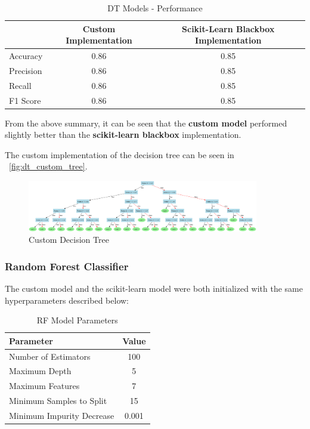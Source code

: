\begin{table}[h!]
  \centering
  \begin{tabular}{lcc}
    \toprule
              & \textbf{Custom Implementation} & \textbf{Scikit-Learn Blackbox Implementation} \\
    \midrule
    Accuracy  & 0.86                           & 0.85                                          \\
    Precision & 0.86                           & 0.85                                          \\
    Recall    & 0.86                           & 0.85                                          \\
    F1 Score  & 0.86                           & 0.85                                          \\
    \bottomrule
  \end{tabular}
  \caption{DT Models - Performance}
  \label{tab:dt_model_performance}
\end{table}

From the above summary, it can be seen that the \textbf{custom model} performed slightly better than the \textbf{scikit-learn blackbox} implementation.

The custom implementation of the decision tree can be seen in ~\autoref{fig:dt_custom_tree}.

\begin{figure}[H]
  \centering
  \includegraphics[width=0.9\textwidth]{tree_visualization.png}
  \caption{Custom Decision Tree}
  \label{fig:dt_custom_tree}
\end{figure}
\FloatBarrier

\subsubsection{Random Forest Classifier}

The custom model and the scikit-learn model were both initialized with the same hyperparameters described below:

\begin{table}[H]
  \centering
  \begin{tabular}{lc}
    \toprule
    \textbf{Parameter}        & \textbf{Value} \\
    \midrule
    Number of Estimators      & 100            \\
    Maximum Depth             & 5              \\
    Maximum Features          & 7              \\
    Minimum Samples to Split  & 15             \\
    Minimum Impurity Decrease & 0.001          \\
    \bottomrule
  \end{tabular}
  \caption{RF Model Parameters}
  \label{tab:rf_modelparams}
\end{table}

